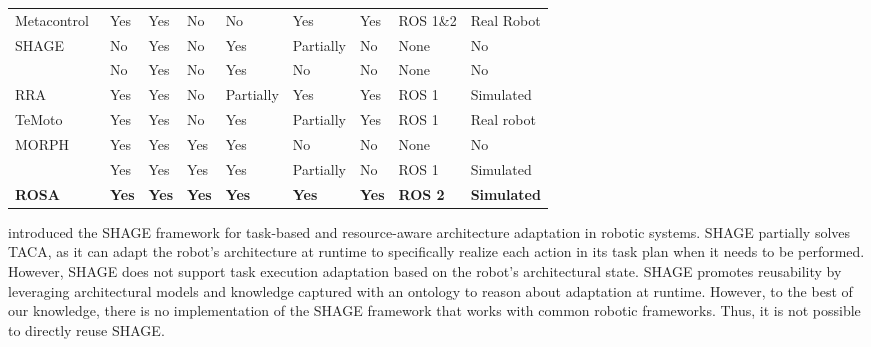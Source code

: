 \begin{table}
{\begin{tabular}{lllllllll}
Metacontrol~\citep{bozhinoski2022mros} & Yes          & Yes          & No           & No           & Yes          & Yes          & ROS 1\&2       & Real Robot         \\
SHAGE~\citep{park2012task}             & No           & Yes          & No           & Yes          & Partially    & No           & None           & No                 \\
\cite{runtime_variability_lotz}        & No           & Yes          & No           & Yes          & No           & No           & None           & No                 \\ %
RRA~\citep{rra_nico}                   & Yes          & Yes          & No           & Partially    & Yes          & Yes          & ROS 1          & Simulated          \\
TeMoto~\citep{temoto}                  & Yes          & Yes          & No           & Yes          & Partially    & Yes          & ROS 1          & Real robot         \\
MORPH~\citep{braberman2018extended}    & Yes          & Yes          & Yes          & Yes          & No           & No           & None           & No                 \\
\cite{CAMARASoftwareArchitectureTask2020}     & Yes          & Yes          & Yes          & Yes          & Partially    & No           & ROS 1          & Simulated          \\ %
\textbf{ROSA}                          & \textbf{Yes} & \textbf{Yes} & \textbf{Yes} & \textbf{Yes} & \textbf{Yes} & \textbf{Yes} & \textbf{ROS 2} & \textbf{Simulated} \\ \hline
\end{tabular}%
}
\end{table}

\cite{park2012task} introduced the SHAGE framework for task-based and resource-aware architecture adaptation in robotic systems. SHAGE partially solves TACA, as it can adapt the robot's architecture at runtime to specifically realize each action in its task plan when it needs to be performed. However, SHAGE does not support task execution adaptation based on the robot's architectural state. %
SHAGE promotes reusability by leveraging architectural models and knowledge captured with an ontology to reason about adaptation at runtime. However, to the best of our knowledge, there is no implementation of the SHAGE framework that works with common robotic frameworks. Thus, it is not possible to directly reuse SHAGE\@.


